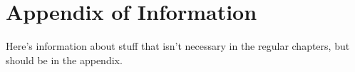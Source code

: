 
\chapter{Appendix of Information} %

\label{AppendixA} %

Here's information about stuff that isn't necessary in the regular chapters, but should be in the appendix.